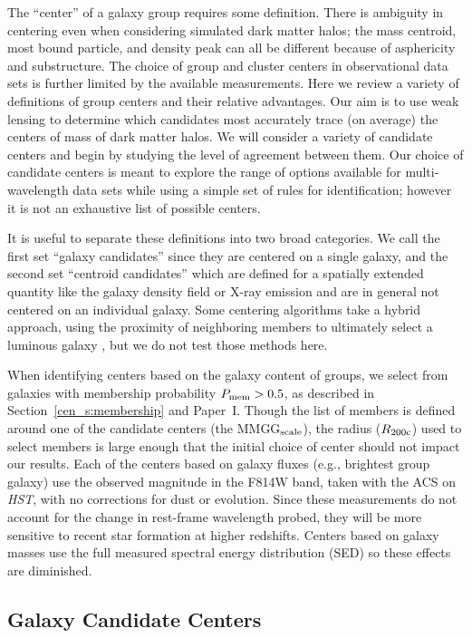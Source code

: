 The ``center'' of a galaxy group requires some definition. There is
ambiguity in centering even when considering simulated dark matter
halos; the mass centroid, most bound particle, and density peak can
all be different because of asphericity and substructure. The
choice of group and cluster centers in observational data sets is
further limited by the available measurements. Here we review a
variety of definitions of group centers and their relative advantages.
Our aim is to use weak lensing to determine which candidates most
accurately trace (on average) the centers of mass of dark matter halos. We
will consider a variety of candidate centers and begin by studying the
level of agreement between them. Our choice of candidate centers is
meant to explore the range of options available for multi-wavelength
data sets while using a simple set of rules for identification;
however it is not an exhaustive list of possible centers.
 
It is useful to separate these definitions into two broad
categories. We call the first set ``galaxy candidates'' since they are
centered on a single galaxy, and the second set ``centroid
candidates'' which are defined for a spatially extended quantity like
the galaxy density field or X-ray emission and are in general not centered on an
individual galaxy. Some centering algorithms take a hybrid
approach, using the proximity of neighboring members to
ultimately select a luminous galaxy \citep[e.g.,][]{Robotham2011}, but we do
not test those methods here.

When identifying centers based on the galaxy content of groups, we
select from galaxies with membership probability $P_{\rm mem}>0.5$, as
described in Section~\ref{cen_s:membership} and Paper~I. Though the list of
members is defined around one of the candidate centers (the MMGG$_{\rm
  scale}$), the radius ($R_{\rm 200c}$) used to select members is
large enough that the initial choice of center should not impact our
results. Each of the centers based on galaxy fluxes (e.g., brightest
group galaxy) use the observed magnitude in the F814W band, taken with
the ACS on \textit{HST}, with no corrections for dust or evolution. Since
these measurements do not account for the change in rest-frame
wavelength probed, they will be more sensitive to recent star
formation at higher redshifts. Centers based on galaxy masses use the
full measured spectral energy distribution (SED) so these effects are diminished.

\subsection{Galaxy Candidate Centers}
\label{cen_s:gal_cand}

